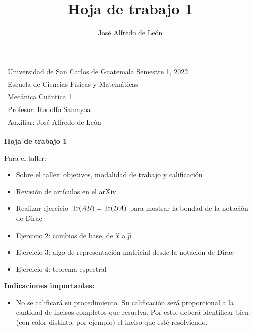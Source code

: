 \documentclass[11pt,letterpaper]{article}
\author{José Alfredo de León}
\title{Hoja de trabajo 1}
\begin{document}
\noindent
{}
\hspace{23mm}
\begin{tabular}{p{149mm}}
Universidad de San Carlos de Guatemala \hspace*{\fill} Semestre 1, 2022 \\
Escuela de Ciencias Físicas y Matemáticas  \\
Mecánica Cuántica 1            \\
Profesor: Rodolfo Samayoa      \\
Auxiliar: José Alfredo de León \\
\end{tabular}

\begin{center}
\bf\Large Hoja de trabajo 1
\end{center}

\noindent
\textcolor{jacolor}{
Para el taller: 
\begin{itemize}
\item Sobre el taller: objetivos, modalidad de trabajo y  calificación
\item Revisión de artículos en el arXiv
\item Realizar ejercicio $\Tr (AB)=\Tr (BA)$ para mostrar la bondad de
la notación de Dirac
\item Ejercicio 2: cambios de base, de $\hat x$ a $\hat p$
\item Ejercicio 3: algo de representación matricial desde la notación 
de Dirac
\item Ejercicio 4: teorema espectral
\end{itemize}
}

\noindent
{}\prntlen{\textwidth}


\noindent\textbf{Indicaciones importantes:}
\begin{itemize}
\item No se calificará su procedimiento. Su calificación será proporcional
a la cantidad de incisos completos que resuelva. Por esto, 
deberá identificar bien (con color distinto, por ejemplo) el inciso que 
esté resolviendo.
\end{itemize}
\end{document}
